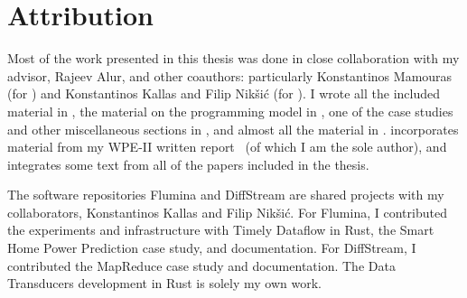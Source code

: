 \section{Attribution}

Most of the work presented in this thesis was done in close collaboration with my advisor, Rajeev Alur, and other coauthors:
particularly Konstantinos Mamouras (for ) and Konstantinos Kallas and Filip Nikšić (for ).
I wrote all the included material in , the material on the programming model in , one of the case studies and other miscellaneous sections in , and almost all the material in .
 incorporates material from my WPE-II written report~ (of which I am the sole author), and  integrates some text from all of the papers included in the thesis.

The software repositories Flumina and DiffStream are shared projects with my collaborators, Konstantinos Kallas and Filip Nikšić.
For Flumina, I contributed the experiments and infrastructure with Timely Dataflow in Rust, the Smart Home Power Prediction case study, and documentation.
For DiffStream, I contributed the MapReduce case study and documentation.
The Data Transducers development in Rust is solely my own work.
